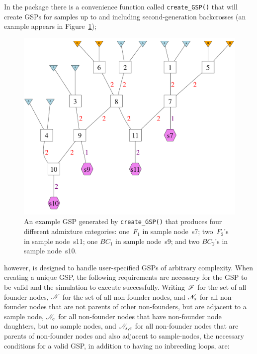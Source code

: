 In the \gscramble{} package there is a convenience function called {\footnotesize\tt create\_GSP()} that
will create GSPs for samples up to and including second-generation backcrosses (an example appears in Figure~\ref{fig:gsp2});
\begin{figure}
\newcommand{\gspcaptwo}{\footnotesize
An example GSP generated by {\footnotesize\tt create\_GSP()} that produces four different
admixture categories: one~$F_1$ in sample node~s7; two~$F_2$'s in sample node~s11; one $BC_1$ in sample node~s9; and two $BC_2$'s in sample node~s10.
}
\begin{center}
\includegraphics[width=\columnwidth]{figures/AllThem.pdf}
\end{center}
\caption[\gspcaptwo]{\gspcaptwo}
\label{fig:gsp2}
\end{figure}
however, \gscramble{} is designed
to handle user-specified GSPs of arbitrary complexity.  When creating a unique GSP, 
the following requirements are necessary for the GSP to be valid 
and the simulation to execute successfully. 
Writing $\mathscr{F}$ for the set of all founder nodes, $\mathscr{N}$ for the set of all non-founder nodes, and $\mathscr{N}_s$ for all non-founder
nodes that are not parents of other non-founders, but are adjacent to a sample node, $\mathscr{N}_e$ for all
non-founder nodes that have non-founder node daughters, but no sample nodes, and $\mathscr{N}_{s,e}$ for all
non-founder nodes that are parents of non-founder nodes and also adjacent to sample-nodes, the necessary conditions
for a valid GSP, in addition to having no inbreeding loops, are:
